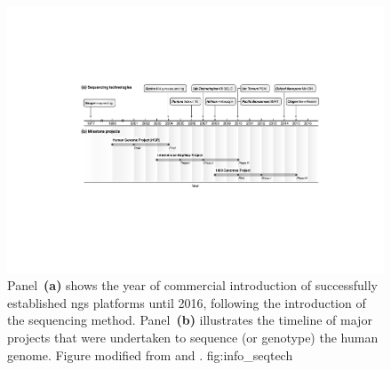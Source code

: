 

\begin{figure}[!htb]
\includegraphics[width=\textwidth]{./img/ch1/info_seqtech}
{Panel~\textbf{(a)} shows the year of commercial introduction of successfully established \gls{ngs} platforms until 2016, following the introduction of the \citet{Sanger:1977vp} sequencing method.
Panel~\textbf{(b)} illustrates the timeline of  major projects that were undertaken to sequence (or genotype) the human genome.
Figure modified from \citet[][Figure~1]{Mardis:2017cq} and \citet[][Table~1]{Naidoo:2011ip}.}
{fig:info_seqtech}
\end{figure}
